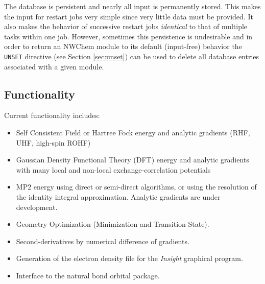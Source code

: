 \fussy

The database is persistent and nearly all input is permanently stored.
This makes the input for restart jobs very simple since very little
data must be provided.  It also makes the behavior of successive
restart jobs {\em identical} to that of multiple tasks within one job.
However, sometimes this persistence is undesirable and in order to
return an NWChem module to its default (input-free) behavior the
\verb+UNSET+ directive (see Section \ref{sec:unset}) 
can be used to delete all
database entries associated with a given module.


\subsection{Functionality}
\label{sec:functionality}

Current functionality includes:
\begin{itemize}
\item Self Consistent Field or Hartree Fock energy and analytic
  gradients (RHF, UHF, high-spin ROHF)
\item Gaussian Density Functional Theory (DFT) energy and analytic
  gradients with many local and
      non-local exchange-correlation potentials
\item MP2 energy using direct or semi-direct algorithms, or using the
  resolution of the identity integral approximation.  Analytic
  gradients are under development.
\item Geometry Optimization (Minimization and Transition State).
\item Second-derivatives by numerical difference of gradients.
\item Generation of the electron density file for the {\em Insight}
      graphical program.
\item Interface to the natural bond orbital package.
\end{itemize}
































